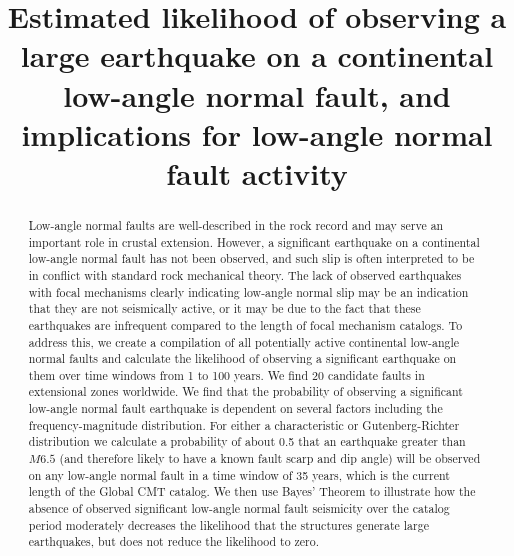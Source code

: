 \documentclass[draft,grl]{AGUTeX}
\begin{document}
\title{Estimated likelihood of observing a large earthquake on a continental 
	   low-angle normal fault, and implications for low-angle normal fault
       activity}



\begin{abstract}
Low-angle normal faults are well-described in the rock record and may serve an
important role in crustal extension.  However, a significant earthquake on
a continental low-angle normal fault has not been observed, and such slip is
often interpreted to be in conflict with standard rock mechanical theory. The
lack of observed earthquakes with focal mechanisms clearly indicating low-angle
normal slip may be an indication that they are not seismically active, or it
may be due to the fact that these earthquakes are infrequent compared to the
length of focal mechanism catalogs. To address this, we create a compilation of
all potentially active continental low-angle normal faults and calculate the
likelihood of observing a significant earthquake on them over time windows from
1 to 100 years. We find 20 candidate faults in extensional zones worldwide.  We
find that the probability of observing a significant low-angle normal fault
earthquake is dependent on several factors including the frequency-magnitude
distribution. For either a characteristic or Gutenberg-Richter distribution we
calculate a probability of about 0.5 that an earthquake greater than $M6.5$
(and therefore likely to have a known fault scarp and dip angle) will be
observed on any low-angle normal fault in a time window of 35 years, which is
the current length of the Global CMT catalog. We then use Bayes' Theorem to
illustrate how the absence of observed significant low-angle normal fault
seismicity over the catalog period moderately decreases the likelihood that the
structures generate large earthquakes, but does not reduce the likelihood to
zero.


\end{abstract}
\end{document}
